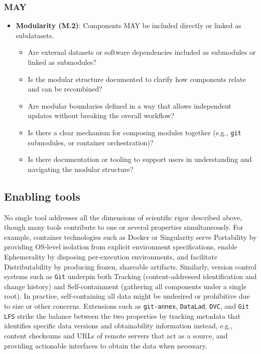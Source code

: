\documentclass{article}
\begin{document}
\subsubsection*{MAY}
\begin{itemize}[label=$\triangleright$]
    \item \textbf{Modularity (M.2)}: Components MAY be included directly or linked as subdatasets.
    \begin{itemize}[label=$\square$]
        \item Are external datasets or software dependencies included as submodules or linked as submodules?
        \item Is the modular structure documented to clarify how components relate and can be recombined?
        \item Are modular boundaries defined in a way that allows independent updates without breaking the overall workflow?
        \item Is there a clear mechanism for composing modules together (e.g., \texttt{git} submodules, or container orchestration)?
        \item Is there documentation or tooling to support users in understanding and navigating the modular structure?
    \end{itemize}
\end{itemize}





\subsection{Enabling tools}

No single tool addresses all the dimensions of scientific rigor described above, though many tools contribute to one or several properties simultaneously.
For example, container technologies such as Docker or Singularity serve Portability by providing OS-level isolation from explicit environment specifications, enable Ephemerality by disposing per-execution environments, and facilitate Distributability by producing frozen, shareable artifacts.
Similarly, version control systems such as \texttt{Git} underpin both Tracking (content-addressed identification and change history) and Self-containment (gathering all components under a single root).
In practice, self-containing all data might be undesired or prohibitive due to size or other concerns. Extensions such as \texttt{git-annex}, \texttt{DataLad}, \texttt{DVC}, and \texttt{Git LFS} strike the balance between the two properties by tracking metadata that identifies specific data versions and obtainability information instead, e.g., content checksums and URLs of remote servers that act as a source, and providing actionable interfaces to obtain the data when necessary.
\end{document}
